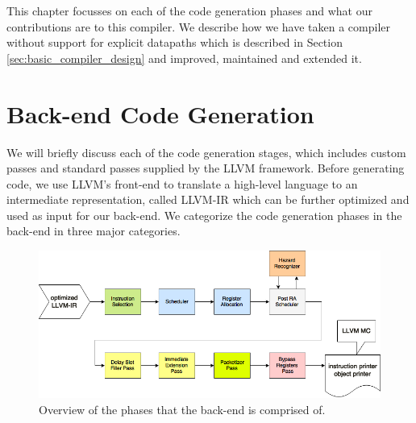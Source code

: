 

This chapter focusses on each of the code generation phases and what our contributions are to this compiler. We describe how we have taken a compiler without support for explicit datapaths which is described in Section \ref{sec:basic_compiler_design} and improved, maintained and extended it. 



\section{Back-end Code Generation}\label{sec:code_generation}
We will briefly discuss each of the code generation stages, which includes custom passes and standard passes supplied by the LLVM framework. Before generating code, we use LLVM's front-end to translate a high-level language to an intermediate representation, called LLVM-IR which can be further optimized and used as input for our back-end. We categorize the code generation phases in the back-end in three major categories.

\begin{figure}[H]
\centering
\hspace*{-.12in}
\includegraphics[scale=0.53]{figures/code_generation}
\caption{Overview of the phases that the back-end is comprised of.}
\label{fig:simd_backend}
\end{figure}

